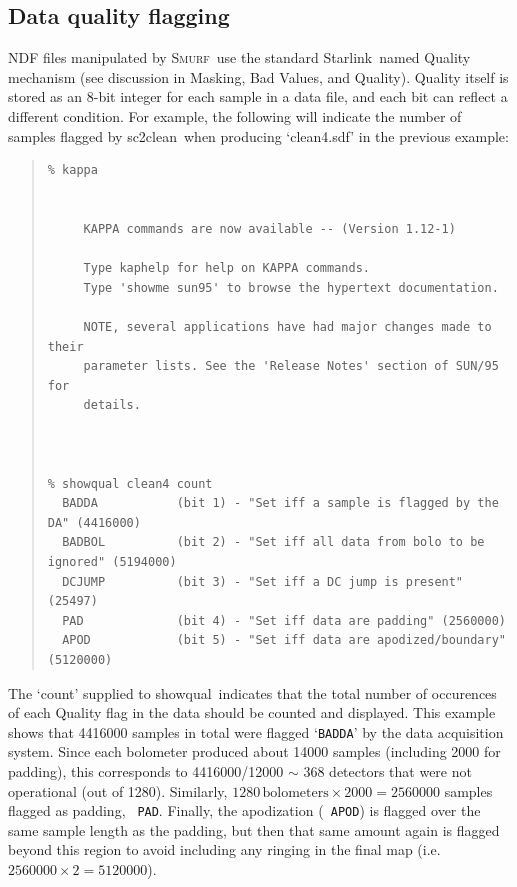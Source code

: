 \documentclass[twoside,11pt]{article}
\newcommand{\htmladdnormallink}[2]{#1}
\newcommand{\xref}[3]{#1}
\newcommand{\xlabel}[1]{}
\renewcommand{\_}{\texttt{\symbol{95}}}
\newenvironment{myquote}{\begin{quote}\begin{small}}{\end{small}\end{quote}}
\newcommand{\starlink}{\htmladdnormallink{Starlink}{http://starlink.jach.hawaii.edu}}
\newcommand{\smurf}{\xref{\textsc{Smurf}}{sun258}{}}
\newcommand{\task}[1]{\textsf{#1}}
\newcommand{\clean}{\xref{\task{sc2clean}}{sun258}{SC2CLEAN}}
\newcommand{\showqual}{\xref{\task{showqual}}{sun95}{SHOWQUAL}}
\begin{document}
\subsection{\xlabel{quality}Data quality flagging}

NDF files manipulated by \smurf\ use the standard \starlink\ named
Quality mechanism (see discussion in \xref{Masking, Bad Values, and
  Quality}{sun95}{se_masking}). Quality itself is stored as an 8-bit
integer for each sample in a data file, and each bit can reflect a
different condition. For example, the following will indicate the
number of samples flagged by \clean\ when producing `clean4.sdf' in
the previous example:

\begin{myquote}
\begin{verbatim}
% kappa


     KAPPA commands are now available -- (Version 1.12-1)

     Type kaphelp for help on KAPPA commands.
     Type 'showme sun95' to browse the hypertext documentation.

     NOTE, several applications have had major changes made to their
     parameter lists. See the 'Release Notes' section of SUN/95 for
     details.



% showqual clean4 count
  BADDA           (bit 1) - "Set iff a sample is flagged by the DA" (4416000)
  BADBOL          (bit 2) - "Set iff all data from bolo to be ignored" (5194000)
  DCJUMP          (bit 3) - "Set iff a DC jump is present" (25497)
  PAD             (bit 4) - "Set iff data are padding" (2560000)
  APOD            (bit 5) - "Set iff data are apodized/boundary" (5120000)
\end{verbatim}
\end{myquote}

The `count' supplied to \showqual\ indicates that the total number of
occurences of each Quality flag in the data should be counted and
displayed.  This example shows that 4416000 samples in total were
flagged `\texttt{BADDA}' by the data acquisition system. Since each
bolometer produced about 14000 samples (including 2000 for padding),
this corresponds to 4416000/12000 $\sim$ 368 detectors that were not
operational (out of 1280). Similarly, $1280 \,\mathrm{bolometers} \times 2000 =
2560000$ samples flagged as padding, \texttt{ PAD}. Finally, the
apodization (\texttt{ APOD}) is flagged over the same sample length as
the padding, but then that same amount again is flagged beyond this
region to avoid including any ringing in the final map (i.e. $2560000
\times 2 = 5120000$).
\end{document}
